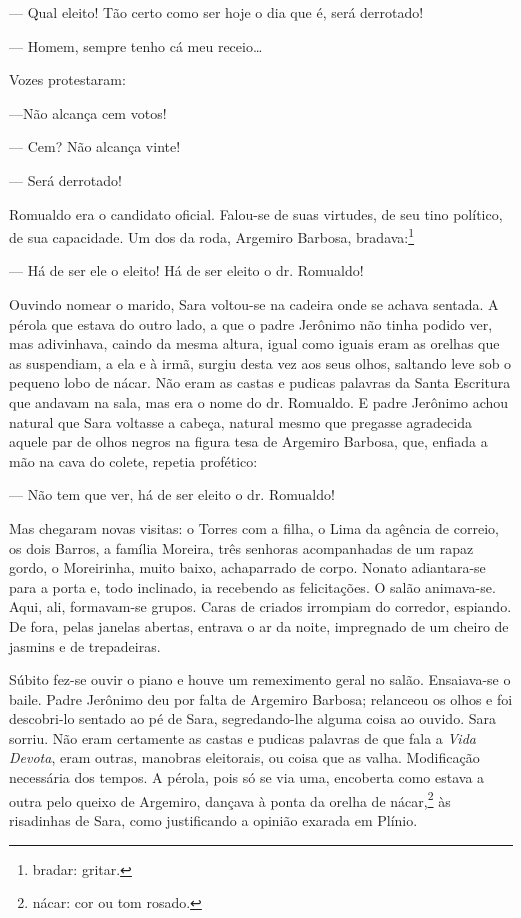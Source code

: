 --- Qual eleito! Tão certo como ser hoje o dia que é, será derrotado!

--- Homem, sempre tenho cá meu receio\ldots{}

Vozes protestaram:

---Não alcança cem votos!

--- Cem? Não alcança vinte!

--- Será derrotado!

Romualdo era o candidato oficial. Falou-se de suas virtudes, de seu tino
político, de sua capacidade. Um dos da roda, Argemiro Barbosa,
bradava:\footnote{bradar: gritar.}

--- Há de ser ele o eleito! Há de ser eleito o dr. Romualdo!

Ouvindo nomear o marido, Sara voltou-se na cadeira onde se achava
sentada. A pérola que estava do outro lado, a que o padre Jerônimo não
tinha podido ver, mas adivinhava, caindo da mesma altura, igual como
iguais eram as orelhas que as suspendiam, a ela e à irmã, surgiu desta
vez aos seus olhos, saltando leve sob o pequeno lobo de nácar. Não eram
as castas e pudicas palavras da Santa Escritura que andavam na sala, mas
era o nome do dr. Romualdo. E padre Jerônimo achou natural que Sara
voltasse a cabeça, natural mesmo que pregasse agradecida aquele par de
olhos negros na figura tesa de Argemiro Barbosa, que, enfiada a mão na
cava do colete, repetia profético:

--- Não tem que ver, há de ser eleito o dr. Romualdo!

Mas chegaram novas visitas: o Torres com a filha, o Lima da agência de
correio, os dois Barros, a família Moreira, três senhoras acompanhadas
de um rapaz gordo, o Moreirinha, muito baixo, achaparrado de corpo.
Nonato adiantara-se para a porta e, todo inclinado, ia recebendo as
felicitações. O salão animava-se. Aqui, ali, formavam-se grupos. Caras
de criados irrompiam do corredor, espiando. De fora, pelas janelas
abertas, entrava o ar da noite, impregnado de um cheiro de jasmins e de
trepadeiras.

Súbito fez-se ouvir o piano e houve um remeximento geral no salão.
Ensaiava-se o baile. Padre Jerônimo deu por falta de Argemiro Barbosa;
relanceou os olhos e foi descobri-lo sentado ao pé de Sara,
segredando-lhe alguma coisa ao ouvido. Sara sorriu. Não eram certamente
as castas e pudicas palavras de que fala a \emph{Vida} \emph{Devota},
eram outras, manobras eleitorais, ou coisa que as valha. Modificação
necessária dos tempos. A pérola, pois só se via uma, encoberta como
estava a outra pelo queixo de Argemiro, dançava à ponta da orelha de
nácar,\footnote{nácar: cor ou tom rosado.} às risadinhas de Sara, como
justificando a opinião exarada em Plínio.

